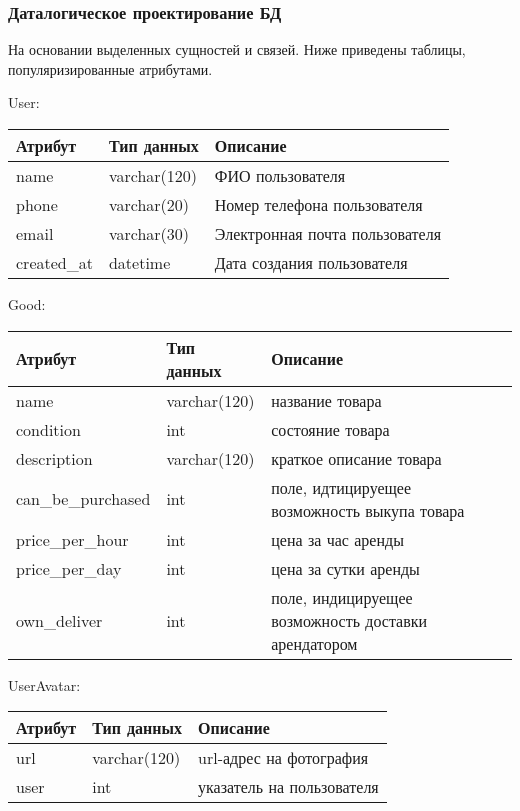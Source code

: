 \subsubsection{Даталогическое проектирование БД}
На основании выделенных сущностей и связей. Ниже приведены таблицы, популяризированные атрибутами.


User:
\bigbreak
\begin{tabular}{ | l | l | l | }
    \hline
    Атрибут & Тип данных & Описание  \\ \hline
    name & varchar(120) & ФИО пользователя \\ \hline
    phone & varchar(20) & Номер телефона пользователя \\ \hline
    email & varchar(30) & Электронная почта пользователя \\ \hline
    created\_at & datetime & Дата создания пользователя \\
    \hline
\end{tabular}
\bigbreak


Good:
\bigbreak
\begin{tabular}{ | l | l | l | }
    \hline
    Атрибут & Тип данных & Описание  \\ \hline
    name & varchar(120) & название товара \\ \hline
    condition & int & состояние товара \\ \hline
    description & varchar(120) & краткое описание товара \\ \hline
    can\_be\_purchased & int & поле, идтицируещее возможность выкупа товара \\ \hline
    price\_per\_hour & int & цена за час аренды \\ \hline
    price\_per\_day & int & цена за сутки аренды \\ \hline
    own\_deliver & int & поле, индицируещее возможность доставки арендатором\\
    \hline
\end{tabular}
\bigbreak



UserAvatar:
\bigbreak
\begin{tabular}{ | l | l | l | }
    \hline
    Атрибут & Тип данных & Описание  \\ \hline
    url & varchar(120) & url-адрес на фотография \\ \hline
    user & int & указатель на пользователя \\
    \hline
\end{tabular}
\bigbreak

